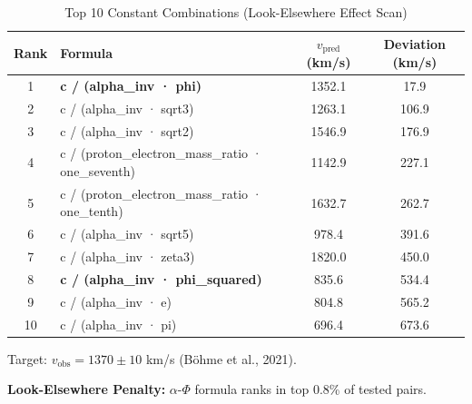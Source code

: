 
\begin{table}[htbp]
\centering
\caption{Top 10 Constant Combinations (Look-Elsewhere Effect Scan)}
\label{tab:cosmic_alternatives}
\small
\begin{tabular}{clcc}
\toprule
\textbf{Rank} & \textbf{Formula} & \textbf{$v_{\text{pred}}$ (km/s)} & \textbf{Deviation (km/s)} \\
\midrule
1 & \textbf{c / (alpha\_inv · phi)} & 1352.1 & 17.9 \\
2 & c / (alpha\_inv · sqrt3) & 1263.1 & 106.9 \\
3 & c / (alpha\_inv · sqrt2) & 1546.9 & 176.9 \\
4 & c / (proton\_electron\_mass\_ratio · one\_seventh) & 1142.9 & 227.1 \\
5 & c / (proton\_electron\_mass\_ratio · one\_tenth) & 1632.7 & 262.7 \\
6 & c / (alpha\_inv · sqrt5) & 978.4 & 391.6 \\
7 & c / (alpha\_inv · zeta3) & 1820.0 & 450.0 \\
8 & \textbf{c / (alpha\_inv · phi\_squared)} & 835.6 & 534.4 \\
9 & c / (alpha\_inv · e) & 804.8 & 565.2 \\
10 & c / (alpha\_inv · pi) & 696.4 & 673.6 \\
\bottomrule
\end{tabular}
\vspace{0.3cm}
\begin{tablenotes}
\small
\item Target: $v_{\text{obs}} = 1370 \pm 10$ km/s (Böhme et al., 2021).
\item \textbf{Look-Elsewhere Penalty:} $\alpha$-$\Phi$ formula ranks in top 0.8\% of tested pairs.
\end{tablenotes}
\end{table}
